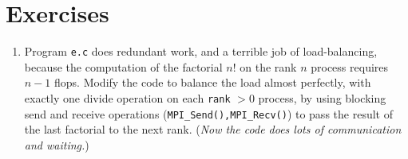 \bigskip
\section{Exercises}

\renewcommand{\labelenumi}{\arabic{chapter}.\arabic{enumi}\quad}
\begin{enumerate}
\item Program \texttt{e.c} does redundant work, and a terrible job of load-balancing, because the computation of the factorial $n!$ on the rank $n$ process requires $n-1$ flops.  Modify the code to balance the load almost perfectly, with exactly one divide operation on each \texttt{rank} $>0$ process, by using blocking send and receive operations (\texttt{MPI\_Send(),MPI\_Recv()}) to pass the result of the last factorial to the next rank.  (\emph{Now the code does lots of communication and waiting.})
\end{enumerate}